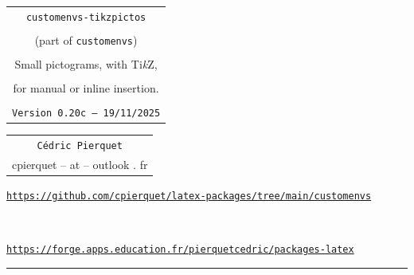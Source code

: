 \documentclass[english,10pt,a4paper]{article}
\def\TPversion{0.20c}
\def\TPdate{19/11/2025}
\begin{document}
\pagestyle{fancy}

\thispagestyle{empty}

\begin{center}
	\begin{minipage}{0.88\linewidth}
	\begin{tcolorbox}[colframe=yellow,colback=yellow!15]
		\begin{center}
			\begin{tabular}{c}
				{\Huge \texttt{customenvs-tikzpictos}} \\
				\\
				{\LARGE (part of \texttt{customenvs})}\\
				\\
				{\LARGE Small pictograms, with Ti\textit{k}Z,} \\
				\\
				{\LARGE for manual or inline insertion.} \\
				\\
				{\small \texttt{Version \TPversion{} -- \TPdate}}
		\end{tabular}
		\end{center}
	\end{tcolorbox}
\end{minipage}
\end{center}

\begin{center}
	\begin{tabular}{c}
		\texttt{Cédric Pierquet}\\
		{\ttfamily cpierquet -- at -- outlook . fr}
	\end{tabular}
\end{center}

\begin{center}
\begin{minipage}{0.85\linewidth}
	\begin{tcolorbox}[colframe=teal,colback=teal!10,halign=center,fontupper=\footnotesize]
		\texttt{\url{https://github.com/cpierquet/latex-packages/tree/main/customenvs}}
		
		~
		
		\texttt{\url{https://forge.apps.education.fr/pierquetcedric/packages-latex}}
	\end{tcolorbox}
\end{minipage}
\end{center}

\vspace*{0.75cm}

\hrule
\end{document}
